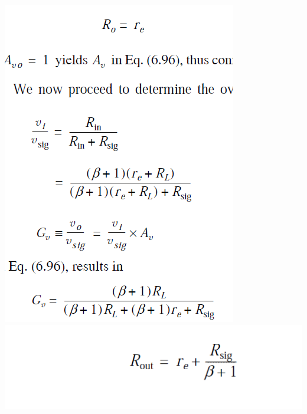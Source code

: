 \documentclass[a4paper]{article}
\begin{document}
\begin{multicols}{3}
\includegraphics[width=\linewidth]{imgs/23}
\includegraphics[width=\linewidth]{imgs/24}

\end{multicols}
\end{document}
